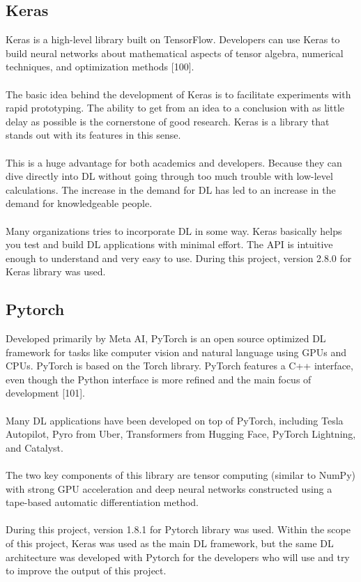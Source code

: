 \documentclass[12pt,twoside,a4]{mwbk}
\begin{document}
\subsection{Keras}
Keras is a high-level library built on TensorFlow. Developers can use Keras to build neural networks about mathematical aspects of tensor algebra, numerical techniques, and optimization methods [100].
\\ \\
The basic idea behind the development of Keras is to facilitate experiments with rapid prototyping. The ability to get from an idea to a conclusion with as little delay as possible is the cornerstone of good research. Keras is a library that stands out with its features in this sense.
\\ \\
This is a huge advantage for both academics and developers. Because they can dive directly into DL without going through too much trouble with low-level calculations. The increase in the demand for DL has led to an increase in the demand for knowledgeable people.
\\ \\
Many organizations tries to incorporate DL in some way. Keras basically helps you test and build DL applications with minimal effort. The API is intuitive enough to understand and very easy to use. During this project, version 2.8.0 for Keras library was used. 

\subsection{Pytorch}
Developed primarily by Meta AI, PyTorch is an open source optimized DL framework for tasks like computer vision and natural language using GPUs and CPUs. PyTorch is based on the Torch library. PyTorch features a C++ interface, even though the Python interface is more refined and the main focus of development [101]. 
\\ \\
Many DL applications have been developed on top of PyTorch, including Tesla Autopilot, Pyro from Uber, Transformers from Hugging Face, PyTorch Lightning, and Catalyst. 
\\ \\
The two key components of this library are tensor computing (similar to NumPy) with strong GPU acceleration and deep neural networks constructed using a tape-based automatic differentiation method.
\\ \\
During this project, version 1.8.1 for Pytorch library was used. Within the scope of this project, Keras was used as the main DL framework, but the same DL architecture was developed with Pytorch for the developers who will use and try to improve the output of this project. 
\end{document}
